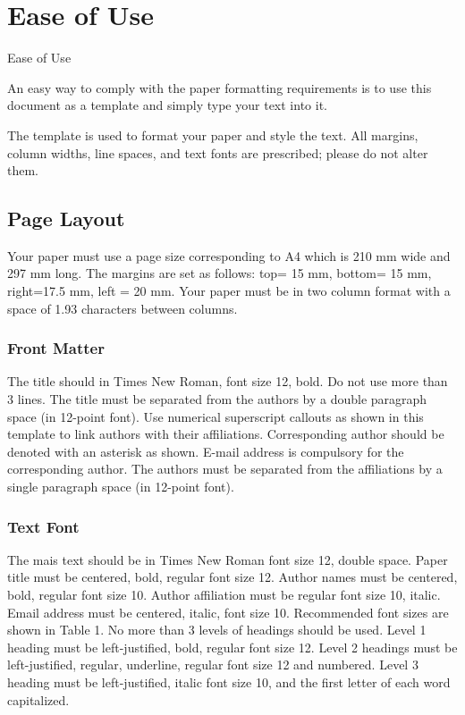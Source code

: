 \documentclass[12pt, twocolumn, a4paper]{article}
\begin{document}
\section{Ease of Use}
Ease of Use

An easy way to comply with the paper formatting requirements is to use this document as a template and simply type your text into it.

The template is used to format your paper and style the text. All margins, column widths, line spaces, and text fonts are prescribed; please do not alter them. 

\subsection{Page Layout}

Your paper must use a page size corresponding to A4 which is 210 mm wide and 297 mm long. The margins are set as follows: top= 15 mm, bottom= 15 mm, right=17.5 mm, left = 20 mm. Your paper must be in two column format with a space of 1.93 characters between columns.


\subsubsection{Front Matter}
The title should in Times New Roman, font size 12, bold. Do not use more than 3 lines. The title must be separated from the authors by a double paragraph space (in 12-point font). Use numerical superscript callouts as shown in this template to link authors with their affiliations.
Corresponding author should be denoted with an asterisk as shown. E-mail address is compulsory for the corresponding author.
The authors must be separated from the affiliations by a single paragraph space (in 12-point font).

\subsubsection{Text Font}

The mais text should be in Times New Roman font size 12, double space. Paper title must be centered, bold, regular font size 12. Author names must be centered, bold, regular font size 10. Author affiliation must be regular font size 10, italic. Email address must be centered, italic, font size 10. Recommended font sizes are shown in Table 1. No more than 3 levels of headings should be used. Level 1 heading must be left-justified, bold, regular font size 12. Level 2 headings must be left-justified, regular, underline, regular font size 12 and numbered. Level 3 heading must be left-justified, italic font size 10, and the first letter of each word capitalized.
\end{document}
